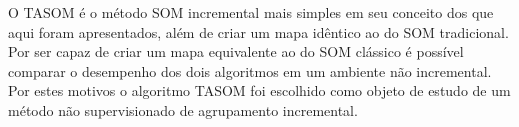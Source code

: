 O TASOM é o método SOM incremental mais simples em seu conceito dos que aqui foram apresentados, além de criar um mapa idêntico ao do SOM tradicional. Por ser capaz de criar um mapa equivalente ao do SOM clássico é possível comparar o desempenho dos dois algoritmos em um ambiente não incremental. Por estes motivos o algoritmo TASOM foi escolhido como objeto de estudo de um método não supervisionado de agrupamento incremental.  



 

 










